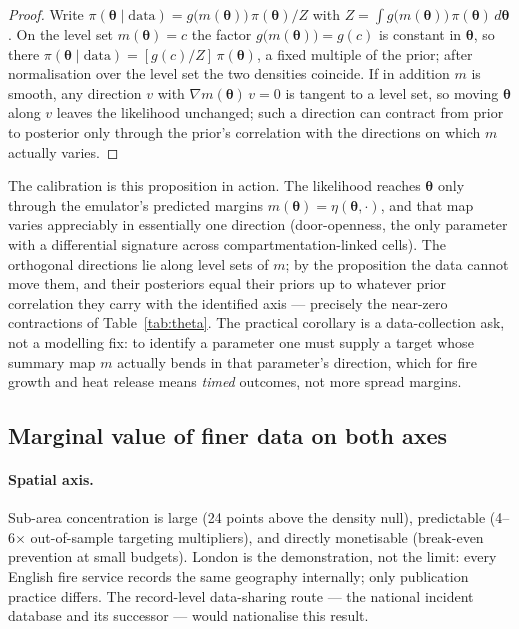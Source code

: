 \documentclass[11pt]{article}
\begin{document}
\begin{proof}
Write $\pi(\boldsymbol\theta\mid\mathrm{data})
= g\big(m(\boldsymbol\theta)\big)\,\pi(\boldsymbol\theta)/Z$ with
$Z=\int g\big(m(\boldsymbol\theta)\big)\,\pi(\boldsymbol\theta)\,
d\boldsymbol\theta$. On the level set $m(\boldsymbol\theta)=c$ the factor
$g\big(m(\boldsymbol\theta)\big)=g(c)$ is constant in $\boldsymbol\theta$, so
there $\pi(\boldsymbol\theta\mid\mathrm{data})=[g(c)/Z]\,\pi(\boldsymbol\theta)$,
a fixed multiple of the prior; after normalisation over the level set the two
densities coincide. If in addition $m$ is smooth, any direction $v$ with
$\nabla m(\boldsymbol\theta)\,v=0$ is tangent to a level set, so moving
$\boldsymbol\theta$ along $v$ leaves the likelihood unchanged; such a direction
can contract from prior to posterior only through the prior's correlation with
the directions on which $m$ actually varies.
\end{proof}

The calibration is this proposition in action. The likelihood reaches
$\boldsymbol\theta$ only through the emulator's predicted margins
$m(\boldsymbol\theta)=\eta(\boldsymbol\theta,\cdot)$, and that map varies
appreciably in essentially one direction (door-openness, the only parameter with
a differential signature across compartmentation-linked cells). The orthogonal
directions lie along level sets of $m$; by the proposition the data cannot move
them, and their posteriors equal their priors up to whatever prior correlation
they carry with the identified axis --- precisely the near-zero contractions of
Table~\ref{tab:theta}. The practical corollary is a data-collection ask, not a
modelling fix: to identify a parameter one must supply a target whose summary map
$m$ actually bends in that parameter's direction, which for fire growth and
heat release means \emph{timed} outcomes, not more spread margins.

\subsection{Marginal value of finer data on both axes}

\paragraph{Spatial axis.} Sub-area concentration is large (24 points above the
density null), predictable (4--6$\times$ out-of-sample targeting multipliers),
and directly monetisable (break-even prevention at small budgets). London is
the demonstration, not the limit: every English fire service records the same
geography internally; only publication practice differs. The record-level
data-sharing route --- the national incident database and its successor ---
would nationalise this result.
\end{document}
